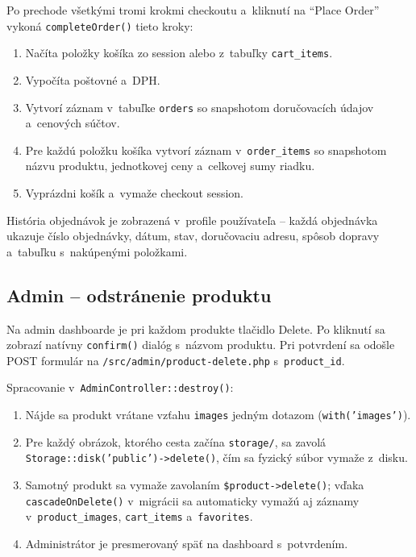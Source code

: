 \documentclass[12pt, a4paper]{article}
\begin{document}
Po prechode všetkými tromi krokmi checkoutu a~kliknutí na ``Place Order'' vykoná \texttt{completeOrder()} tieto kroky:

\begin{enumerate}
  \item Načíta položky košíka zo session alebo z~tabuľky \texttt{cart\_items}.
  \item Vypočíta poštovné a~DPH.
  \item Vytvorí záznam v~tabuľke \texttt{orders} so snapshotom doručovacích údajov a~cenových súčtov.
  \item Pre každú položku košíka vytvorí záznam v~\texttt{order\_items} so snapshotom názvu produktu, jednotkovej ceny a~celkovej sumy riadku.
  \item Vyprázdni košík a~vymaže checkout session.
\end{enumerate}

História objednávok je zobrazená v~profile používateľa -- každá objednávka ukazuje číslo objednávky, dátum, stav, doručovaciu adresu, spôsob dopravy a~tabuľku s~nakúpenými položkami.

\subsection{Admin -- odstránenie produktu}

Na admin dashboarde je pri každom produkte tlačidlo Delete. Po kliknutí sa zobrazí natívny \texttt{confirm()} dialóg s~názvom produktu. Pri potvrdení sa odošle POST formulár na \texttt{/src/admin/product-delete.php} s~\texttt{product\_id}.

Spracovanie v~\texttt{AdminController::destroy()}:

\begin{enumerate}
  \item Nájde sa produkt vrátane vzťahu \texttt{images} jedným dotazom (\texttt{with('images')}).
  \item Pre každý obrázok, ktorého cesta začína \texttt{storage/}, sa zavolá \texttt{Storage::disk('public')->delete()}, čím sa fyzický súbor vymaže z~disku.
  \item Samotný produkt sa vymaže zavolaním \texttt{\$product->delete()}; vďaka \texttt{cascadeOnDelete()} v~migrácii sa automaticky vymažú aj záznamy v~\texttt{product\_images}, \texttt{cart\_items} a~\texttt{favorites}.
  \item Administrátor je presmerovaný späť na dashboard s~potvrdením.
\end{enumerate}
\end{document}
